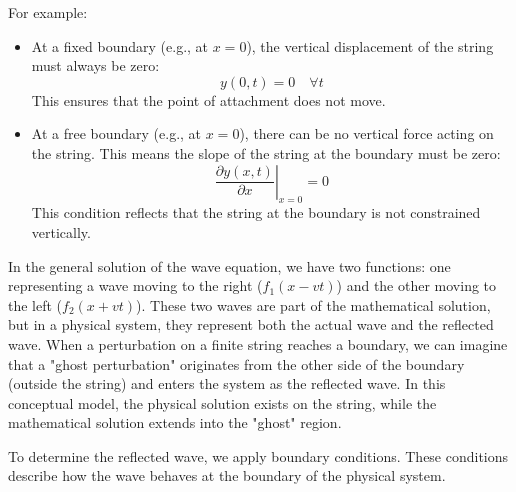 \documentclass[a4paper]{article}
\begin{document}
For example:
\begin{itemize}
    \item At a fixed boundary (e.g., at \(x = 0\)), the vertical displacement of the string must always be zero:
    \[
    y(0, t) = 0 \quad \forall t
    \]
    This ensures that the point of attachment does not move.

    \item At a free boundary (e.g., at \(x = 0\)), there can be no vertical force acting on the string. This means the slope of the string at the boundary must be zero:
    \[
    \left. \frac{\partial y(x, t)}{\partial x} \right|_{x=0} = 0
    \]
    This condition reflects that the string at the boundary is not constrained vertically.
\end{itemize}

In the general solution of the wave equation, we have two functions: one representing a wave moving to the right (\(f_1(x - vt)\)) and the other moving to the left (\(f_2(x + vt)\)). These two waves are part of the mathematical solution, but in a physical system, they represent both the actual wave and the reflected wave. When a perturbation on a finite string reaches a boundary, we can imagine that a "ghost perturbation" originates from the other side of the boundary (outside the string) and enters the system as the reflected wave. In this conceptual model, the physical solution exists on the string, while the mathematical solution extends into the "ghost" region. 

To determine the reflected wave, we apply boundary conditions. These conditions describe how the wave behaves at the boundary of the physical system.
\end{document}
